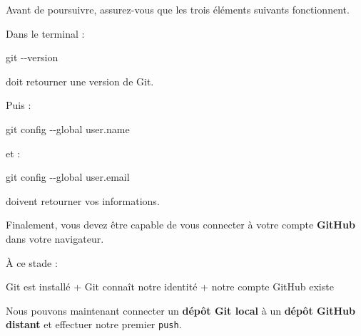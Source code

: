 \documentclass[
  letterpaper,
  DIV=11,
  numbers=noendperiod]{scrreprt}
\newenvironment{Shaded}{\begin{snugshade}}{\end{snugshade}}
\newcommand{\AttributeTok}[1]{\textcolor[rgb]{0.40,0.45,0.13}{#1}}
\newcommand{\FunctionTok}[1]{\textcolor[rgb]{0.28,0.35,0.67}{#1}}
\newcommand{\NormalTok}[1]{\textcolor[rgb]{0.00,0.23,0.31}{#1}}
\begin{document}
Avant de poursuivre, assurez-vous que les trois éléments suivants
fonctionnent.

Dans le terminal :

\begin{Shaded}
\begin{Highlighting}[]
\FunctionTok{git} \AttributeTok{{-}{-}version}
\end{Highlighting}
\end{Shaded}

doit retourner une version de Git.

Puis :

\begin{Shaded}
\begin{Highlighting}[]
\FunctionTok{git}\NormalTok{ config }\AttributeTok{{-}{-}global}\NormalTok{ user.name}
\end{Highlighting}
\end{Shaded}

et :

\begin{Shaded}
\begin{Highlighting}[]
\FunctionTok{git}\NormalTok{ config }\AttributeTok{{-}{-}global}\NormalTok{ user.email}
\end{Highlighting}
\end{Shaded}

doivent retourner vos informations.

Finalement, vous devez être capable de vous connecter à votre compte
\textbf{GitHub} dans votre navigateur.

\begin{tcolorbox}[enhanced jigsaw, arc=.35mm, title=\textcolor{quarto-callout-tip-color}{\faLightbulb}\hspace{0.5em}{Nous sommes prêts}, colback=white, left=2mm, rightrule=.15mm, toptitle=1mm, opacityback=0, bottomtitle=1mm, breakable, colframe=quarto-callout-tip-color-frame, coltitle=black, toprule=.15mm, titlerule=0mm, opacitybacktitle=0.6, bottomrule=.15mm, colbacktitle=quarto-callout-tip-color!10!white, leftrule=.75mm]

À ce stade :

\begin{Shaded}
\begin{Highlighting}[]
\NormalTok{Git est installé}
\NormalTok{       +}
\NormalTok{Git connaît notre identité}
\NormalTok{       +}
\NormalTok{notre compte GitHub existe}
\end{Highlighting}
\end{Shaded}

Nous pouvons maintenant connecter un \textbf{dépôt Git local} à un
\textbf{dépôt GitHub distant} et effectuer notre premier \texttt{push}.

\end{tcolorbox}
\end{document}
